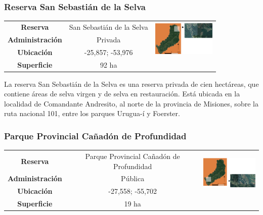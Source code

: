\subsubsection{Reserva San Sebastián de la Selva}
\begin{table}[H]
\centering
\begin{tabular}{|c|c|c|}
\hline
 \textbf{Reserva} & San Sebastián de la Selva &   \multirow{ 3}{*}{\includegraphics[width=30mm]{Imagenes/San Sebastian.png}}\\ 
\textbf{Administración} & Privada\\
        
        \textbf{Ubicación} & -25,857; -53,976 \\
         
        \textbf{Superficie} & 92 ha\\
\hline        
\end{tabular}

\label{Profundidad}
\end{table}
La reserva San Sebastián de la Selva es una reserva privada de cien hectáreas, que contiene áreas de selva virgen y de selva en restauración. Está ubicada en la localidad de Comandante Andresito, al norte de la provincia de Misiones, sobre la ruta nacional 101, entre los parques Urugua-í y Foerster. 
\subsubsection{Parque Provincial Cañadón de Profundidad}
\begin{table}[H]
\centering
\begin{tabular}{|c|c|c|}
\hline
 \textbf{Reserva} & Parque Provincial Cañadón de Profundidad &   \multirow{ 3}{*}{\includegraphics[width=30mm]{Imagenes/Profundidad.png}}\\ 
\textbf{Administración} & Pública\\
        
        \textbf{Ubicación} & -27,558; -55,702 \\
         
        \textbf{Superficie} & 19 ha\\
\hline        
\end{tabular}

\label{Profundidad}
\end{table}
